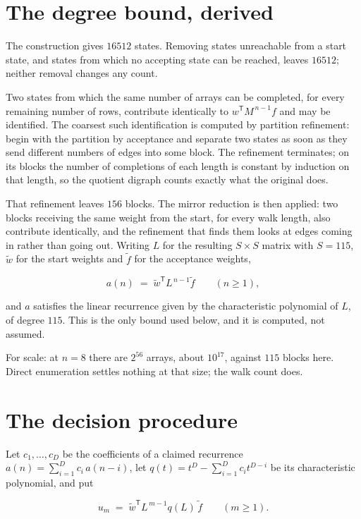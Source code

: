 \documentclass[11pt]{article}
\theoremstyle{definition}
\begin{document}
\section{The degree bound, derived}

The construction gives $16512$ states. Removing states unreachable from a start state, and states from which no accepting state can be reached, leaves $16512$; neither removal changes any count.

Two states from which the same number of arrays can be completed, for every remaining number of rows, contribute identically to $w^{\mathsf T}M^{\,n-1}f$ and may be identified. The coarsest such identification is computed by partition refinement: begin with the partition by acceptance and separate two states as soon as they send different numbers of edges into some block. The refinement terminates; on its blocks the number of completions of each length is constant by induction on that length, so the quotient digraph counts exactly what the original does.

That refinement leaves $156$ blocks. The mirror reduction is then applied: two blocks receiving the same weight from the start, for every walk length, also contribute identically, and the refinement that finds them looks at edges coming in rather than going out. Writing $L$ for the resulting $S \times S$ matrix with $S = 115$, $\tilde w$ for the start weights and $\tilde f$ for the acceptance weights,

\[a(n) \;=\; \tilde w^{\mathsf T} L^{\,n-1} \tilde f \qquad (n \ge 1),\]

and $a$ satisfies the linear recurrence given by the characteristic polynomial of $L$, of degree $115$. This is the only bound used below, and it is computed, not assumed.

For scale: at $n = 8$ there are $2^{56}$ arrays, about $10^{17}$, against $115$ blocks here. Direct enumeration settles nothing at that size; the walk count does.

\section{The decision procedure}

Let $c_1,\dots,c_D$ be the coefficients of a claimed recurrence $a(n) = \sum_{i=1}^{D} c_i\,a(n-i)$, let $q(t) = t^{D} - \sum_{i=1}^{D} c_i t^{D-i}$ be its characteristic polynomial, and put

\[u_m \;=\; \tilde w^{\mathsf T} L^{\,m-1} q(L)\,\tilde f \qquad (m \ge 1).\]
\end{document}
